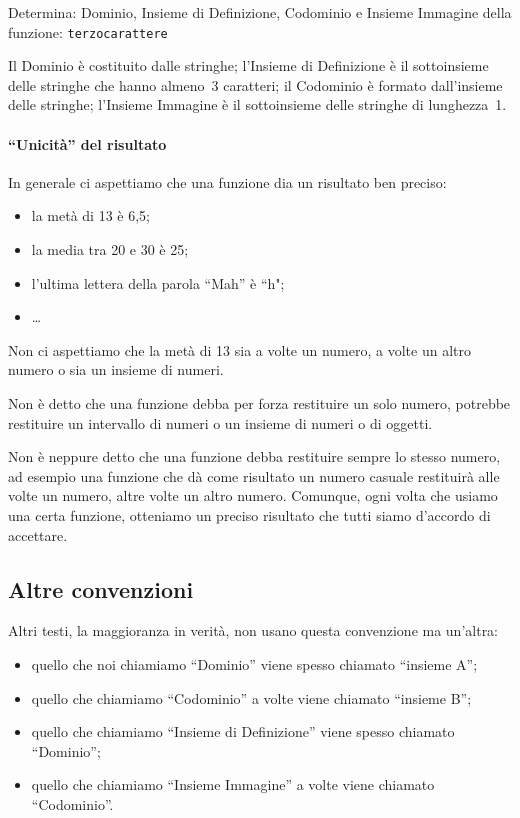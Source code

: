 \begin{esempio}
Determina: Dominio, Insieme di Definizione, Codominio e Insieme Immagine 
della funzione: \texttt{terzocarattere} 

Il Dominio è costituito dalle stringhe; l'Insieme di Definizione è il 
sottoinsieme delle stringhe che hanno almeno~3 caratteri; il Codominio è 
formato dall'insieme delle stringhe; l'Insieme Immagine è il sottoinsieme 
delle stringhe di lunghezza~1.
\end{esempio}

\paragraph{``Unicità'' del risultato}

In generale ci aspettiamo che una funzione dia un risultato ben preciso:
\begin{itemize} [nosep]
\item la metà di 13 è 6,5;
\item la media tra 20 e 30 è 25;
\item l'ultima lettera della parola  ``Mah'' è  ``h";
\item \dots
\end{itemize}

Non ci aspettiamo che la metà di 13 sia a volte un numero, a volte un altro 
numero o sia un insieme di numeri.

Non è detto che una funzione debba per forza restituire un solo numero, 
potrebbe restituire un intervallo di numeri o un insieme di numeri o di 
oggetti.

Non è neppure detto che una funzione debba restituire sempre lo stesso 
numero, ad esempio una funzione che dà come risultato un numero casuale 
restituirà alle volte un numero, altre volte un altro numero.
Comunque, ogni volta che usiamo una certa funzione, otteniamo un preciso 
risultato che tutti siamo d'accordo di accettare.

\subsection{Altre convenzioni}

Altri testi, la maggioranza in verità, non usano 
questa convenzione ma un'altra:

\begin{itemize} [nosep]
 \item quello che noi chiamiamo ``Dominio'' viene spesso chiamato  
``insieme A'';
 \item quello che chiamiamo ``Codominio'' a volte viene chiamato  ``insieme 
B'';
 \item quello che chiamiamo ``Insieme di Definizione'' viene spesso 
chiamato ``Dominio'';
 \item quello che chiamiamo ``Insieme Immagine'' a volte viene chiamato 
``Codominio''.
\end{itemize}


